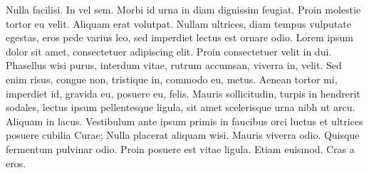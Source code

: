 \noindent Nulla facilisi. In vel sem. Morbi id urna in diam dignissim feugiat. Proin molestie tortor eu velit. Aliquam erat volutpat. Nullam ultrices, diam tempus vulputate egestas, eros pede varius leo, sed imperdiet lectus est ornare odio. Lorem ipsum dolor sit amet, consectetuer adipiscing elit. Proin consectetuer velit in dui. Phasellus wisi purus, interdum vitae, rutrum accumsan, viverra in, velit. Sed enim risus, congue non, tristique in, commodo eu, metus. Aenean tortor mi, imperdiet id, gravida eu, posuere eu, felis. Mauris sollicitudin, turpis in hendrerit sodales, lectus ipsum pellentesque ligula, sit amet scelerisque urna nibh ut arcu. Aliquam in lacus. Vestibulum ante ipsum primis in faucibus orci luctus et ultrices posuere cubilia Curae; Nulla placerat aliquam wisi. Mauris viverra odio. Quisque fermentum pulvinar odio. Proin posuere est vitae ligula. Etiam euismod. Cras a eros.